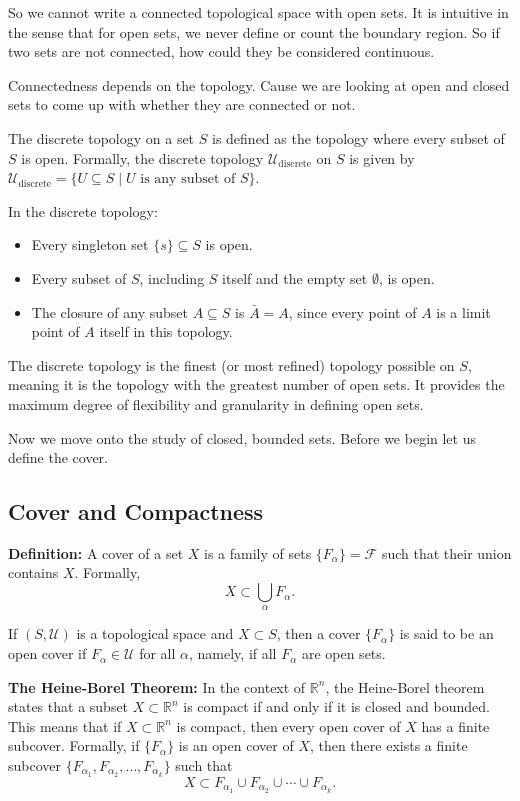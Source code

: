 \documentclass{article}
\begin{document}
So we cannot write a connected topological space with open sets. It is intuitive in the sense that for open sets, we never define or count the boundary region. So if two sets are not connected, how could they be considered continuous. 

Connectedness depends on the topology. Cause we are looking at open and closed sets to come up with whether they are connected or not. 

\begin{theorem}
    The discrete topology on a set \( S \) is defined as the topology where every subset of \( S \) is open. Formally, the discrete topology \( \mathcal{U}_{\text{discrete}} \) on \( S \) is given by \( \mathcal{U}_{\text{discrete}} = \{ U \subseteq S \mid U \text{ is any subset of } S \} \).

In the discrete topology: 
\begin{itemize}
    \item  Every singleton set \( \{s\} \subseteq S \) is open.
    \item Every subset of \( S \), including \( S \) itself and the empty set \( \emptyset \), is open.
   \item The closure of any subset \( A \subseteq S \) is \( \bar{A} = A \), since every point of \( A \) is a limit point of \( A \) itself in this topology.
\end{itemize}
\end{theorem}

The discrete topology is the finest (or most refined) topology possible on \( S \), meaning it is the topology with the greatest number of open sets. It provides the maximum degree of flexibility and granularity in defining open sets. 

Now we move onto the study of closed, bounded sets. Before we begin let us define the cover. 

\subsection{Cover and Compactness}

\begin{theorem}
    \textbf{Definition:} A cover of a set \( X \) is a family of sets \( \{ F_\alpha \} = \mathcal{F} \) such that their union contains \( X \). Formally,
\[
X \subset \bigcup_{\alpha} F_\alpha.
\]

If \((S, \mathcal{U})\) is a topological space and \( X \subset S \), then a cover \( \{ F_\alpha \} \) is said to be an open cover if \( F_\alpha \in \mathcal{U} \) for all \( \alpha \), namely, if all \( F_\alpha \) are open sets.

\textbf{The Heine-Borel Theorem:} In the context of \(\mathbb{R}^n\), the Heine-Borel theorem states that a subset \( X \subset \mathbb{R}^n \) is compact if and only if it is closed and bounded. This means that if \( X \subset \mathbb{R}^n \) is compact, then every open cover of \( X \) has a finite subcover. Formally, if \( \{ F_\alpha \} \) is an open cover of \( X \), then there exists a finite subcover \( \{ F_{\alpha_1}, F_{\alpha_2}, \ldots, F_{\alpha_k} \} \) such that
\[
X \subset F_{\alpha_1} \cup F_{\alpha_2} \cup \cdots \cup F_{\alpha_k}.
\]
\end{theorem}
\end{document}

